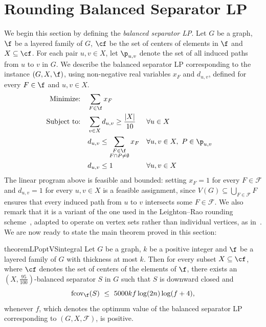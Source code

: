 \section{Rounding Balanced Separator LP}\label{sec:rounding_balanced_sep}




We begin this section by defining the \emph{balanced separator LP}. Let $G$ be a graph, $\f$ be a layered family of $G$, $\cf$ be the set of centers of elements in $\f$ and $X \subseteq \cf$. For each pair $u, v \in X$, let $\p_{u,v}$ denote the set of all induced paths from $u$ to $v$ in $G$. We describe the balanced separator LP corresponding to the instance $(G, X, \f)$, using non-negative real variables $x_F$ and $d_{u,v}$, defined for every $F \in \f$ and $u, v \in X$.
\begin{align}\label{lp:container_cover}
    \text{Minimize:} \quad & \sum_{F \in \f} x_F \\
    \nonumber
    \text{Subject to:} \quad 
    & \sum_{v \in X} d_{u,v} \geq \frac{|X|}{10} && \forall u \in X \\
    \nonumber
    & d_{u,v} \leq \sum_{\substack{F \in \f \\ F \cap P \neq \emptyset}} x_F && \forall u,v \in X,\ P \in \p_{u,v} \\
    \nonumber
    & d_{u,v} \leq 1 && \forall u,v \in X
\end{align}
\newline
The linear program above is feasible and bounded: setting $x_F = 1$ for every $F \in \mathcal{F}$ and $d_{u,v} = 1$ for every $u, v \in X$ is a feasible assignment, since $V(G) \subseteq \bigcup_{F \in \mathcal{F}} F$ ensures that every induced path from $u$ to $v$ intersects some $F \in \mathcal{F}$. We also remark that it is a variant of the one used in the Leighton–Rao rounding scheme~\cite{leighton1999multicommodity}, adapted to operate on vertex sets rather than individual vertices, as in~\cite{KorchemnaL0S024,chudnovsky2025treewidth}. We are now ready to state the main theorem proved in this section:

\begin{restatable}{theorem}{LPoptVSintegral}\label{thm:balanced_separator_rounding}
Let $G$ be a graph, $k$ be a positive integer and $\f$ be a layered family of $G$ with thickness at most $k$. Then for every subset $X \subseteq \cf$, where $\cf$ denotes the set of centers of the elements of $\f$, there exists an $(X, \tfrac{95}{100})$-balanced separator $S$ in $G$ such that $S$ is downward closed and
$$
\mathrm{fcov}_{\f}(S)\ \leq\ 5000kf  \log(2n) \log (f+4),
$$
whenever $f$, which denotes the optimum value of the balanced separator LP corresponding to $(G, X, \mathcal{F})$, is positive.
\end{restatable}

